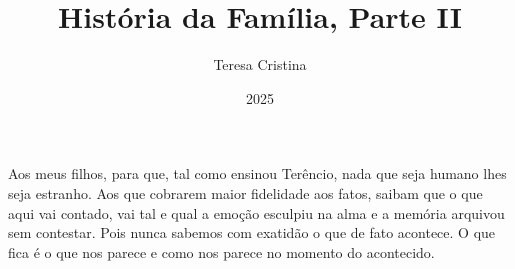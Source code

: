 \documentclass[12pt, a5paper, twoside]{book}
\title{História da Família, Parte II}
\author{Teresa Cristina}
\date{2025}
\newenvironment{dedication}{
    \clearpage
    \thispagestyle{empty}
    \vspace*{\stretch{3}}
    \small
    \itshape
    \raggedright
}{\par\vspace*{\stretch{1}}\clearpage\normalfont} %
\begin{document}
\maketitle

\begin{dedication}
Aos meus filhos, para que, tal como ensinou Terêncio, nada que seja humano lhes seja estranho. 
Aos que cobrarem maior fidelidade aos fatos, saibam que o que aqui vai contado, vai tal e qual a emoção esculpiu na alma e a memória arquivou sem contestar. 
Pois nunca sabemos com exatidão o que de fato acontece. O que fica é o que nos parece e como nos parece no momento do acontecido. 
\end{dedication}

\tableofcontents
\end{document}
